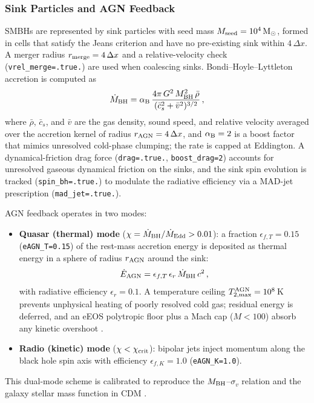 \documentclass[fleqn,usenatbib]{mnras}
\newcommand{\code}[1]{\texttt{#1}}
\newcommand{\Msun}{\mathrm{M_\odot}}
\newcommand{\MBH}{M_{\rm BH}}
\newcommand{\vdisp}{\sigma_v}
\begin{document}
\subsubsection{Sink Particles and AGN Feedback}
\label{sec:agn}

SMBHs are represented by sink particles \citep{Bleuler2014} with seed
mass $M_{\rm seed} = 10^{4}\,\Msun$, formed in cells that satisfy the
Jeans criterion and have no pre-existing sink within $4\,\Delta x$.
A merger radius $r_{\rm merge}=4\,\Delta x$ and a relative-velocity
check (\code{vrel\_merge=.true.}) are used when coalescing sinks.
Bondi--Hoyle--Lyttleton accretion is computed as
\begin{equation}
  \dot{M}_{\rm BH} = \alpha_{\rm B}\,
    \frac{4\pi\,G^2\,\MBH^2\,\bar\rho}
         {(\bar{c}_s^2 + \bar{v}^2)^{3/2}}\,,
  \label{eq:bondi}
\end{equation}
where $\bar\rho$, $\bar{c}_s$, and $\bar{v}$ are the gas density,
sound speed, and relative velocity averaged over the accretion
kernel of radius $r_{\rm AGN}=4\,\Delta x$, and $\alpha_{\rm B}=2$
is a boost factor that mimics unresolved cold-phase clumping; the
rate is capped at Eddington.  A dynamical-friction drag force
(\code{drag=.true.}, \code{boost\_drag=2}) accounts for
unresolved gaseous dynamical friction on the sinks, and the sink
spin evolution is tracked (\code{spin\_bh=.true.}) to modulate the
radiative efficiency via a MAD-jet prescription
(\code{mad\_jet=.true.}).

AGN feedback operates in two modes:
\begin{itemize}
  \item \textbf{Quasar (thermal) mode} ($\chi =
    \dot{M}_{\rm BH}/\dot{M}_{\rm Edd} > 0.01$): a fraction
    $\epsilon_{f,T}=0.15$ (\code{eAGN\_T=0.15}) of the rest-mass
    accretion energy is deposited as thermal energy in a sphere of
    radius $r_{\rm AGN}$ around the sink:
    \begin{equation}
      \dot{E}_{\rm AGN} =
        \epsilon_{f,T}\,\epsilon_r\,\dot{M}_{\rm BH}\,c^2\,,
    \end{equation}
    with radiative efficiency $\epsilon_r = 0.1$.  A temperature
    ceiling $T^{\rm AGN}_{2,\max}=10^{8}\,$K prevents unphysical
    heating of poorly resolved cold gas; residual energy is
    deferred, and an eEOS polytropic floor plus a Mach cap ($M<100$)
    absorb any kinetic overshoot \citep{KimInPrep2026}.
  \item \textbf{Radio (kinetic) mode} ($\chi < \chi_{\rm crit}$):
    bipolar jets inject momentum along the black hole spin axis
    with efficiency $\epsilon_{f,K}=1.0$ (\code{eAGN\_K=1.0}).
\end{itemize}
This dual-mode scheme is calibrated to reproduce the
$\MBH$--$\vdisp$ relation and the galaxy stellar mass function in
CDM \citep{Dubois2012}.
\end{document}
